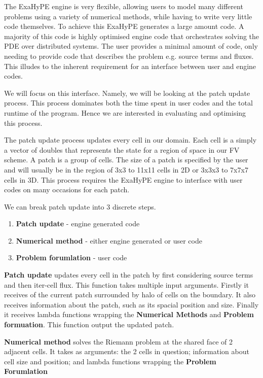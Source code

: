 The ExaHyPE engine is very flexible, allowing users to model many different problems using a variety of numerical methods, while having to write very little code themselves.
To achieve this ExaHyPE generates a large amount code.
A majority of this code is highly optimised engine code that orchestrates solving the PDE over distributed systems.
The user provides a minimal amount of code, only needing to provide code that describes the problem e.g. source terms and fluxes.
This illudes to the inherent requirement for an interface between user and engine codes.

We will focus on this interface.
Namely, we will be looking at the patch update process.
This process dominates both the time spent in user codes and the total runtime of the program.
Hence we are interested in evaluating and optimising this process.

The patch update process updates every cell in our domain.
Each cell is a simply a vector of doubles that represents the state for a region of space in our FV scheme. 
A patch is a group of cells.
The size of a patch is specified by the user and will usually be in the region of 3x3 to 11x11 cells in 2D or 3x3x3 to 7x7x7 cells in 3D. %
This process requires the ExaHyPE engine to interface with user codes on many occasions for each patch.
 
\newcommand{\func}[1]{\textbf{#1}}
\newcommand{\var}[1]{\textbf{#1}}

We can break patch update into 3 discrete steps.
\begin{enumerate}
    \item \func{Patch update} - engine generated code
    \item  \func{Numerical method} - either engine generated or user code
    \item \func{Problem forumlation} - user code
\end{enumerate}

\func{Patch update} updates every cell in the patch by first considering source terms and then iter-cell flux.
This function takes multiple input arguments.
Firstly it receives of the current patch surrounded by halo of cells on the boundary.
It also receives information about the patch, such as its spacial position and size.
Finally it receives lambda functions wrapping the \func{Numerical Methods} and \func{Problem formuation}. 
This function output the updated patch.  

\func{Numerical method} solves the Riemann problem at the shared face of 2 adjacent cells.
It takes as arguments: the 2 cells in question; information about cell size and position; and lambda functions wrapping the \func{Problem Forumlation}

